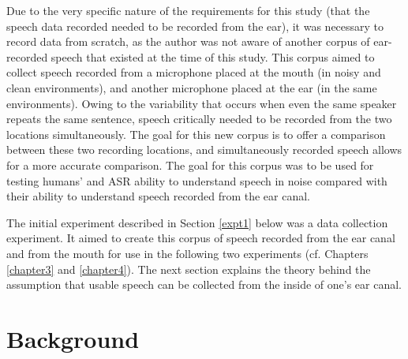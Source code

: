 Due to the very specific nature of the requirements for this study (that the speech data recorded needed to be recorded from the ear), it was necessary to record data from scratch, as the author was not aware of another corpus of ear-recorded speech that existed at the time of this study.  This corpus aimed to collect speech recorded from a microphone placed at the mouth (in noisy and clean environments), and another microphone placed at the ear (in the same environments). Owing to the variability that occurs when even the same speaker repeats the same sentence, speech critically needed to be recorded from the two locations simultaneously.  The goal for this new corpus is to offer a comparison between these two recording locations, and simultaneously recorded speech allows for a more accurate comparison.  The goal for this corpus was to be used for testing humans' and ASR ability to understand speech in noise compared with their ability to understand speech recorded from the ear canal.


The initial experiment described in Section \ref{expt1} below was a data collection experiment.  It aimed to create this corpus of speech recorded from the ear canal and from the mouth for use in the following two experiments (cf. Chapters \ref{chapter3} and \ref{chapter4}).  The next section explains the theory behind the assumption that usable speech can be collected from the inside of one's ear canal.

\section{Background}




